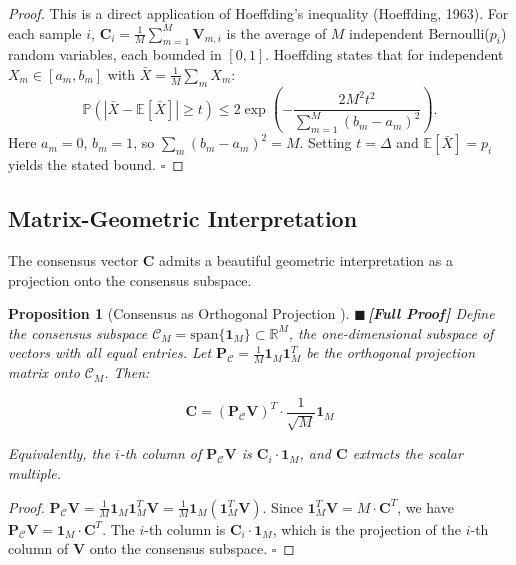 \documentclass[12pt,a4paper]{article}
\newtheorem{proposition}[theorem]{Proposition}
\theoremstyle{definition}
\newcommand{\rigorFull}{{\color{rigorcolor}$\blacksquare$\,\textbf{[Full Proof]}}}
\newcommand{\R}{\mathbb{R}}
\newcommand{\E}{\mathbb{E}}
\newcommand{\Pbb}{\mathbb{P}}
\newcommand{\cC}{\mathcal{C}}
\newcommand{\abs}[1]{\left|#1\right|}
\newcommand{\ones}{\mathbf{1}}
\newcommand{\mat}[1]{\mathbf{#1}}
\newcommand{\dimspan}{\mathrm{span}}
\begin{document}
\begin{proof}
This is a direct application of Hoeffding's inequality (Hoeffding, 1963). For each 
sample $i$, $\mat{C}_i = \frac{1}{M}\sum_{m=1}^{M} \mat{V}_{m,i}$ is the average of 
$M$ independent Bernoulli($p_i$) random variables, each bounded in $[0,1]$. Hoeffding 
states that for independent $X_m \in [a_m, b_m]$ with $\bar{X} = \frac{1}{M}\sum_m X_m$:
\[
\Pbb(\abs{\bar{X} - \E[\bar{X}]} \geq t) \leq 2\exp\!\left(-\frac{2M^2 t^2}{\sum_{m=1}^{M} (b_m - a_m)^2}\right).
\]
Here $a_m = 0$, $b_m = 1$, so $\sum_m (b_m - a_m)^2 = M$. Setting $t = \Delta$ and 
$\E[\bar{X}] = p_i$ yields the stated bound. \hfill $\square$
\end{proof}

\subsection{Matrix-Geometric Interpretation }

The consensus vector $\mat{C}$ admits a beautiful geometric interpretation as a 
projection onto the consensus subspace.

\begin{proposition}[Consensus as Orthogonal Projection ]\label{prop:consensus_projection}
\rigorFull
Define the consensus subspace $\cC_M = \dimspan\{\ones_M\} \subset \R^M$, the 
one-dimensional subspace of vectors with all equal entries. Let 
$\mat{P}_{\cC} = \frac{1}{M}\ones_M \ones_M^T$ be the orthogonal projection matrix 
onto $\cC_M$. Then:

\begin{equation}\label{eq:consensus_projection}
    \mat{C} = (\mat{P}_{\cC} \mat{V})^T \cdot \frac{1}{\sqrt{M}} \ones_M
\end{equation}

Equivalently, the $i$-th column of $\mat{P}_{\cC} \mat{V}$ is 
$\mat{C}_i \cdot \ones_M$, and $\mat{C}$ extracts the scalar multiple.
\end{proposition}

\begin{proof}
$\mat{P}_{\cC} \mat{V} = \frac{1}{M}\ones_M \ones_M^T \mat{V} = \frac{1}{M}\ones_M (\ones_M^T \mat{V})$.
Since $\ones_M^T \mat{V} = M \cdot \mat{C}^T$, we have 
$\mat{P}_{\cC} \mat{V} = \ones_M \cdot \mat{C}^T$. The $i$-th column is 
$\mat{C}_i \cdot \ones_M$, which is the projection of the $i$-th column of $\mat{V}$ 
onto the consensus subspace. \hfill $\square$
\end{proof}
\end{document}
